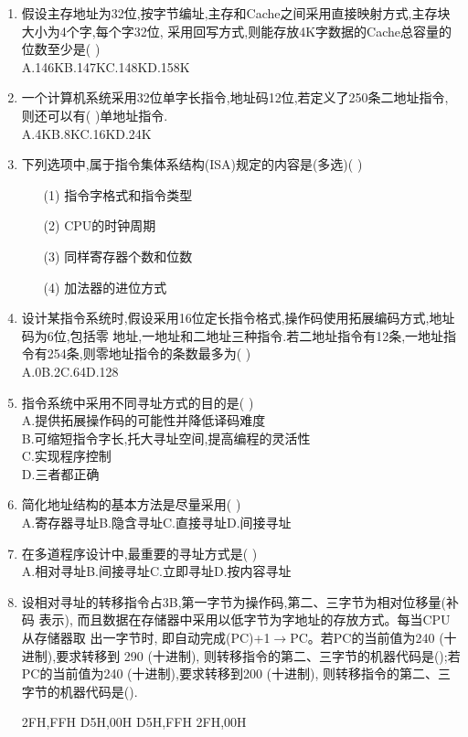\documentclass[12pt, a4paper, oneside, UTF8]{ctexbook}
\begin{document}
\begin{enumerate}
    \item \bt 假设主存地址为32位,按字节编址,主存和Cache之间采用直接映射方式,主存块大小为4个字,每个字32位,
    采用回写方式,则能存放4K字数据的Cache总容量的位数至少是(   ) \\
    A.146K\qquad B.147K\qquad C.148K\qquad D.158K 

    \item \bl 一个计算机系统采用32位单字长指令,地址码12位,若定义了250条二地址指令,则还可以有(   )单地址指令. \\
    A.4K\qquad B.8K\qquad C.16K\qquad D.24K 

    \item \bt 下列选项中,属于指令集体系结构(ISA)规定的内容是(多选)(    )
    \begin{enumerate}
        \item [(1)] 指令字格式和指令类型 
        \item [(2)] CPU的时钟周期 
        \item [(3)] 同样寄存器个数和位数 
        \item [(4)] 加法器的进位方式
    \end{enumerate}

    \item \bt 设计某指令系统时,假设采用16位定长指令格式,操作码使用拓展编码方式,地址码为6位,包括零
    地址,一地址和二地址三种指令.若二地址指令有12条,一地址指令有254条,则零地址指令的条数最多为(   )\\
    A.0\qquad B.2\qquad C.64\qquad D.128

    \item 指令系统中采用不同寻址方式的目的是(   )\\
    A.提供拓展操作码的可能性并降低译码难度 \\
    B.可缩短指令字长,托大寻址空间,提高编程的灵活性 \\
    C.实现程序控制 \\
    D.三者都正确 

    \item 简化地址结构的基本方法是尽量采用(   ) \\
    A.寄存器寻址\qquad B.隐含寻址\qquad C.直接寻址\qquad D.间接寻址 

    \item 在多道程序设计中,最重要的寻址方式是(   ) \\
    A.相对寻址\qquad B.间接寻址\qquad C.立即寻址\qquad D.按内容寻址
    
    \item 设相对寻址的转移指令占3B,第一字节为操作码,第二、三字节为相对位移量(补码 表示),
    而且数据在存储器中采用以低字节为字地址的存放方式。每当CPU从存储器取 出一字节时,
    即自动完成(PC)+1$\rightarrow$PC。若PC的当前值为240 (十进制),要求转移到 290 (十进制),
    则转移指令的第二、三字节的机器代码是();若PC的当前值为240 (十进制),要求转移到200 (十进制),
    则转移指令的第二、三字节的机器代码是().
    \begin{choices}
        \task 2FH,FFH 
        \task D5H,00H 
        \task D5H,FFH 
        \task 2FH,00H
    \end{choices}


\end{enumerate}
\end{document}
